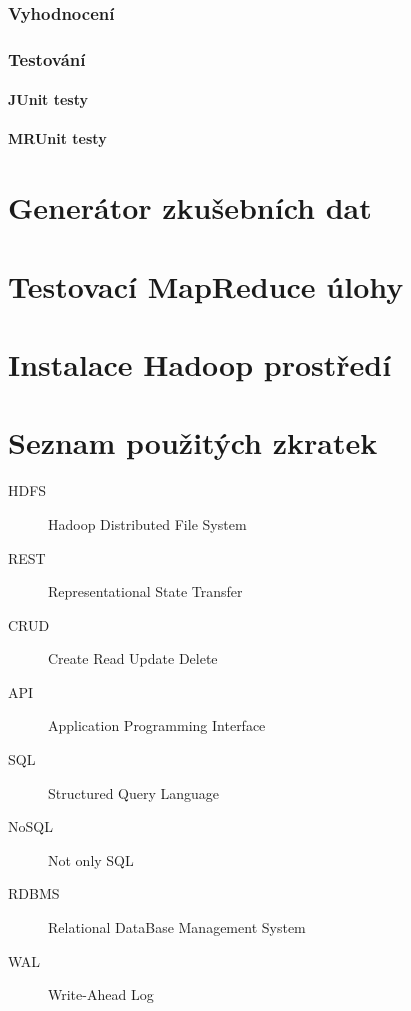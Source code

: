 \documentclass[thesis=M,czech]{FITthesis}[2012/06/26]
\begin{document}
\subsection{Vyhodnocení}
\subsection{Testování}
\subsubsection{JUnit testy}
\subsubsection{MRUnit testy}



\begin{conclusion}
\end{conclusion}




\appendix

\chapter{Generátor zkušebních dat}
\chapter{Testovací MapReduce úlohy}
\chapter{Instalace Hadoop prostředí}

\chapter{Seznam použitých zkratek}
\begin{description}
	\item[HDFS] Hadoop Distributed File System
	\item[REST] Representational State Transfer
	\item[CRUD] Create Read Update Delete
	\item[API] Application Programming Interface
	\item[SQL] Structured Query Language
	\item[NoSQL] Not only SQL
	\item[RDBMS] Relational DataBase Management System
	\item[WAL] Write-Ahead Log
	

\end{description}
\end{document}
